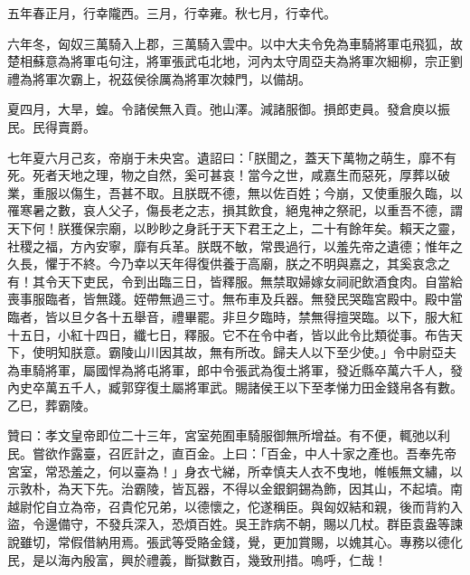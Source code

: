 \begin{pinyinscope}
五年春正月，行幸隴西。三月，行幸雍。秋七月，行幸代。

六年冬，匈奴三萬騎入上郡，三萬騎入雲中。以中大夫令免為車騎將軍屯飛狐，故楚相蘇意為將軍屯句注，將軍張武屯北地，河內太守周亞夫為將軍次細柳，宗正劉禮為將軍次霸上，祝茲侯徐厲為將軍次棘門，以備胡。

夏四月，大旱，蝗。令諸侯無入貢。弛山澤。減諸服御。損郎吏員。發倉庾以振民。民得賣爵。

七年夏六月己亥，帝崩于未央宮。遺詔曰：「朕聞之，蓋天下萬物之萌生，靡不有死。死者天地之理，物之自然，奚可甚哀！當今之世，咸嘉生而惡死，厚葬以破業，重服以傷生，吾甚不取。且朕既不德，無以佐百姓；今崩，又使重服久臨，以罹寒暑之數，哀人父子，傷長老之志，損其飲食，絕鬼神之祭祀，以重吾不德，謂天下何！朕獲保宗廟，以眇眇之身託于天下君王之上，二十有餘年矣。賴天之靈，社稷之福，方內安寧，靡有兵革。朕既不敏，常畏過行，以羞先帝之遺德；惟年之久長，懼于不終。今乃幸以天年得復供養于高廟，朕之不明與嘉之，其奚哀念之有！其令天下吏民，令到出臨三日，皆釋服。無禁取婦嫁女祠祀飲酒食肉。自當給喪事服臨者，皆無踐。姪帶無過三寸。無布車及兵器。無發民哭臨宮殿中。殿中當臨者，皆以旦夕各十五舉音，禮畢罷。非旦夕臨時，禁無得擅哭臨。以下，服大紅十五日，小紅十四日，纖七日，釋服。它不在令中者，皆以此令比類從事。布告天下，使明知朕意。霸陵山川因其故，無有所改。歸夫人以下至少使。」令中尉亞夫為車騎將軍，屬國悍為將屯將軍，郎中令張武為復土將軍，發近縣卒萬六千人，發內史卒萬五千人，臧郭穿復土屬將軍武。賜諸侯王以下至孝悌力田金錢帛各有數。乙巳，葬霸陵。

贊曰：孝文皇帝即位二十三年，宮室苑囿車騎服御無所增益。有不便，輒弛以利民。嘗欲作露臺，召匠計之，直百金。上曰：「百金，中人十家之產也。吾奉先帝宮室，常恐羞之，何以臺為！」身衣弋綈，所幸慎夫人衣不曳地，帷帳無文繡，以示敦朴，為天下先。治霸陵，皆瓦器，不得以金銀銅錫為飾，因其山，不起墳。南越尉佗自立為帝，召貴佗兄弟，以德懷之，佗遂稱臣。與匈奴結和親，後而背約入盜，令邊備守，不發兵深入，恐煩百姓。吳王詐病不朝，賜以几杖。群臣袁盎等諫說雖切，常假借納用焉。張武等受賂金錢，覺，更加賞賜，以媿其心。專務以德化民，是以海內殷富，興於禮義，斷獄數百，幾致刑措。嗚呼，仁哉！


\end{pinyinscope}